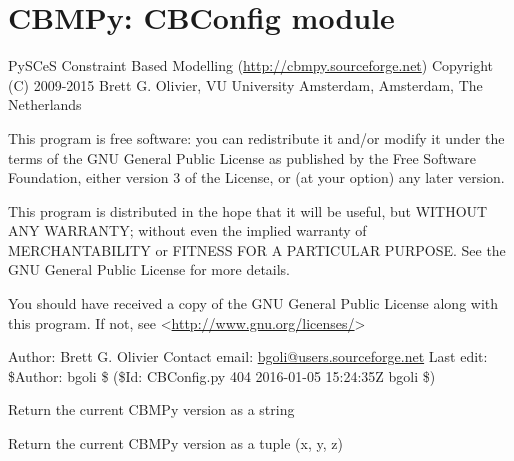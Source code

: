 \documentclass[a4paper,11pt,english]{sphinxmanual}
\begin{document}
\label{modules_doc:module-cbmpy.CBConfig}

\section{CBMPy: CBConfig module}
\label{modules_doc:cbmpy-cbconfig-module}
PySCeS Constraint Based Modelling (\href{http://cbmpy.sourceforge.net}{http://cbmpy.sourceforge.net})
Copyright (C) 2009-2015 Brett G. Olivier, VU University Amsterdam, Amsterdam, The Netherlands

This program is free software: you can redistribute it and/or modify
it under the terms of the GNU General Public License as published by
the Free Software Foundation, either version 3 of the License, or
(at your option) any later version.

This program is distributed in the hope that it will be useful,
but WITHOUT ANY WARRANTY; without even the implied warranty of
MERCHANTABILITY or FITNESS FOR A PARTICULAR PURPOSE.  See the
GNU General Public License for more details.

You should have received a copy of the GNU General Public License
along with this program.  If not, see \textless{}\href{http://www.gnu.org/licenses/}{http://www.gnu.org/licenses/}\textgreater{}

Author: Brett G. Olivier
Contact email: \href{mailto:bgoli@users.sourceforge.net}{bgoli@users.sourceforge.net}
Last edit: \$Author: bgoli \$ (\$Id: CBConfig.py 404 2016-01-05 15:24:35Z bgoli \$)

\begin{fulllineitems}
\label{modules_doc:cbmpy.CBConfig.current_version}
Return the current CBMPy version as a string

\end{fulllineitems}


\begin{fulllineitems}
\label{modules_doc:cbmpy.CBConfig.current_version_tuple}
Return the current CBMPy version as a tuple (x, y, z)

\end{fulllineitems}

\label{modules_doc:module-cbmpy.CBCPLEX}
\end{document}

